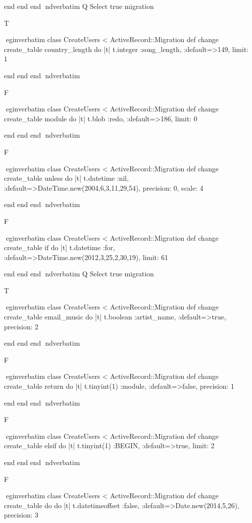     end 
  end 
end
nd{verbatim}
Q
 Select true migration

T

egin{verbatim}
 class CreateUsers < ActiveRecord::Migration 
  def change 
    create_table country_length do |t| 
      t.integer :song_length, :default=>149, limit: 1
    
    end 
  end 
end
nd{verbatim}

F

egin{verbatim}
 class CreateUsers < ActiveRecord::Migration 
  def change 
    create_table module do |t| 
      t.blob :redo, :default=>186, limit: 0
    
    end 
  end 
end
nd{verbatim}

F

egin{verbatim}
 class CreateUsers < ActiveRecord::Migration 
  def change 
    create_table unless do |t| 
      t.datetime :nil, :default=>DateTime.new(2004,6,3,11,29,54), precision: 0, scale: 4
    
    end 
  end 
end
nd{verbatim}

F

egin{verbatim}
 class CreateUsers < ActiveRecord::Migration 
  def change 
    create_table if do |t| 
      t.datetime :for, :default=>DateTime.new(2012,3,25,2,30,19), limit: 61
    
    end 
  end 
end
nd{verbatim}
Q
 Select true migration

T

egin{verbatim}
 class CreateUsers < ActiveRecord::Migration 
  def change 
    create_table email_music do |t| 
      t.boolean :artist_name, :default=>true, precision: 2
    
    end 
  end 
end
nd{verbatim}

F

egin{verbatim}
 class CreateUsers < ActiveRecord::Migration 
  def change 
    create_table return do |t| 
      t.tinyint(1) :module, :default=>false, precision: 1
    
    end 
  end 
end
nd{verbatim}

F

egin{verbatim}
 class CreateUsers < ActiveRecord::Migration 
  def change 
    create_table elsif do |t| 
      t.tinyint(1) :BEGIN, :default=>true, limit: 2
    
    end 
  end 
end
nd{verbatim}

F

egin{verbatim}
 class CreateUsers < ActiveRecord::Migration 
  def change 
    create_table do do |t| 
      t.datetimeoffset :false, :default=>Date.new(2014,5,26), precision: 3
    
